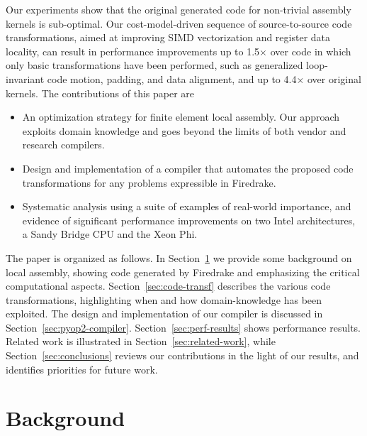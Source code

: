 \documentclass[conference]{IEEEtran}
\begin{document}
Our experiments show that the original generated code for non-trivial assembly kernels is sub-optimal. Our cost-model-driven sequence of source-to-source code transformations, aimed at improving SIMD vectorization and register data locality, can result in performance improvements up to 1.5$\times$ over code in which only basic transformations have been performed, such as generalized loop-invariant code motion, padding, and data alignment, and up to 4.4$\times$ over original kernels. The contributions of this paper are
\begin{itemize}
\item An optimization strategy for finite element local assembly. Our approach exploits domain knowledge and goes beyond the limits of both vendor and research compilers.
\item Design and implementation of a compiler that automates the proposed code transformations for any problems expressible in Firedrake.
\item Systematic analysis using a suite of examples of real-world importance, and evidence of significant performance improvements on two Intel architectures, a Sandy Bridge CPU and the Xeon Phi.
\end{itemize}

The paper is organized as follows. In Section~\ref{sec:background} we provide some background on local assembly, showing code generated by Firedrake and emphasizing the critical computational aspects. Section~\ref{sec:code-transf} describes the various code transformations, highlighting when and how domain-knowledge has been exploited. The design and implementation of our compiler is discussed in Section~\ref{sec:pyop2-compiler}. Section~\ref{sec:perf-results} shows performance results. Related work is illustrated in Section~\ref{sec:related-work}, while Section~\ref{sec:conclusions} reviews our contributions in the light of our results, and identifies priorities for future work.



\section{Background}
\label{sec:background}
\end{document}
